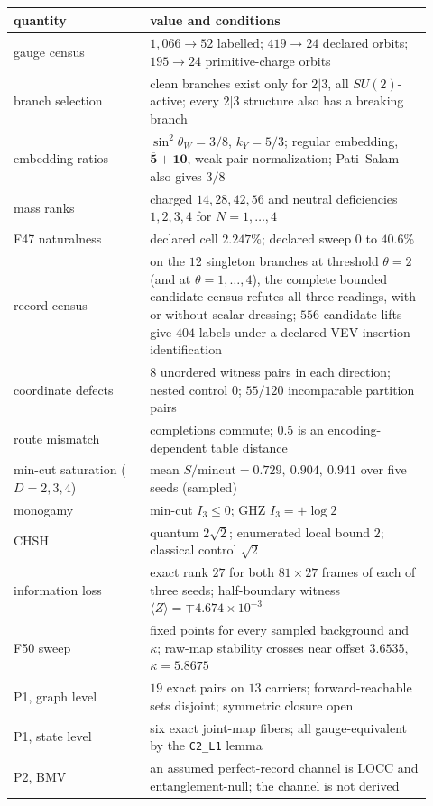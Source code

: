 \documentclass[11pt]{article}
\theoremstyle{definition}
\begin{document}
\begin{center}
\small
\begin{longtable}[]{@{}p{0.3\linewidth}p{0.62\linewidth}@{}}
\toprule
quantity & value and conditions\\
\midrule
\endhead
gauge census & \(1{,}066\to52\) labelled; \(419\to24\) declared orbits; \(195\to24\) primitive-charge orbits\\
branch selection & clean branches exist only for \(2|3\), all \(SU(2)\)-active; every \(2|3\) structure also has a
breaking branch\\
embedding ratios & \(\sin^2\theta_W=3/8\), \(k_Y=5/3\); regular embedding, \(\overline{\mathbf5}+\mathbf{10}\), weak-pair
normalization; Pati--Salam also gives \(3/8\)\\
mass ranks & charged \(14,28,42,56\) and neutral deficiencies \(1,2,3,4\) for \(N=1,\dots,4\)\\
F47 naturalness & declared cell \(2.247\%\); declared sweep \(0\) to \(40.6\%\)\\
record census & on the \(12\) singleton branches at threshold \(\theta=2\) (and at \(\theta=1,\dots,4\)), the complete
bounded candidate census refutes all three readings, with or without scalar dressing; \(556\) candidate lifts give
\(404\) labels under a declared VEV-insertion identification\\
coordinate defects & \(8\) unordered witness pairs in each direction; nested control \(0\); \(55/120\) incomparable partition pairs\\
route mismatch & completions commute; \(0.5\) is an encoding-dependent table distance\\
min-cut saturation (\(D=2,3,4\)) & mean \(S/\mathrm{mincut}=0.729,\ 0.904,\ 0.941\) over five seeds (sampled)\\
monogamy & min-cut \(I_3\le0\); GHZ \(I_3=+\log2\)\\
CHSH & quantum \(2\sqrt2\); enumerated local bound \(2\); classical control \(\sqrt2\)\\
information loss & exact rank \(27\) for both \(81\times27\) frames of each of three seeds; half-boundary witness
\(\langle Z\rangle=\mp4.674\times10^{-3}\)\\
F50 sweep & fixed points for every sampled background and \(\kappa\); raw-map stability crosses near offset \(3.6535\),
\(\kappa=5.8675\)\\
P1, graph level & \(19\) exact pairs on \(13\) carriers; forward-reachable sets disjoint; symmetric closure open\\
P1, state level & six exact joint-map fibers; all gauge-equivalent by the \texttt{C2\_L1} lemma\\
P2, BMV & an assumed perfect-record channel is LOCC and entanglement-null; the channel is not derived\\
\bottomrule
\end{longtable}
\end{center}
\end{document}

